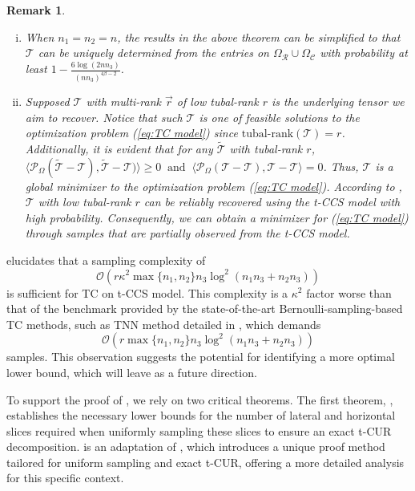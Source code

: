 \documentclass[twoside,12pt]{article}
\newtheorem{remark}{Remark}
\def\cO{\mathcal{O}}
\def\cO{\mathcal{O}}
\begin{document}
\begin{remark}
   \begin{enumerate}[(i)]
       \item 
 When $n_1=n_2=n$, the results in the above theorem can be simplified to that 
 $\mathcal{T}$ can be uniquely determined from the entries on $\Omega_{\mathcal{R}}\cup \Omega_{\mathcal{C}}$ with probability at least $1- \frac{6\log(2nn_3)}{(nn_3)^{4\beta-2}}$.
  \item 
Supposed $\mathcal{T}$ with multi-rank $\vec{r}$ of low tubal-rank $r$ is the underlying tensor we aim to recover. 
Notice that such \(\mathcal{T}\) is one of feasible solutions to the optimization problem (\ref{eq:TC model}) since $\text{tubal-rank}(\mathcal{T}) = r$. Additionally, it is evident that for any  $\widetilde{\mathcal{T}}$ with tubal-rank $r$, $\langle\mathcal{P}_{\Omega}(\widetilde{\mathcal{T}}-\mathcal{T}), \widetilde{\mathcal{T}}-\mathcal{T})\rangle \geq 0~ \text{ and }~ \langle\mathcal{P}_{\Omega}(\mathcal{T}-\mathcal{T}), \mathcal{T}-\mathcal{T}\rangle = 0$. Thus, 
\(\mathcal{T}\) is a  global minimizer to the optimization problem (\ref{eq:TC model}). According to , $\mathcal{T}$ with low tubal-rank $r$ can be reliably recovered using the t-CCS model with high probability. Consequently, we can obtain a minimizer for   (\ref{eq:TC model}) through samples that are partially observed from the t-CCS model.
 \end{enumerate}
\end{remark}
  elucidates that a sampling complexity of $$\cO(r\kappa^2\max\{n_1,n_2\}n_3\log^2(n_{1}n_{3}+n_{2}n_{3}))$$ is sufficient for TC on t-CCS model. This complexity is  a $\kappa^2$ factor worse than that of the benchmark provided by the state-of-the-art Bernoulli-sampling-based TC methods, such as TNN method detailed in \citep{zhang2017exact}, which demands 
\[
\mathcal{O}(r\max\{n_1,n_2\}n_3\log^2(n_{1}n_{3}+n_{2}n_{3}))
\]
samples.  This observation suggests the potential for identifying a more optimal lower bound, which will leave as  a future direction. 
 
To support the proof of , we rely on two critical theorems. The first theorem, , establishes the necessary lower bounds for the number of lateral and horizontal slices required when uniformly sampling these slices to ensure an exact t-CUR decomposition.  is an adaptation of \citep[Corollary 3.10]{Tarzanagh2018}, which introduces a unique proof method tailored for uniform sampling and exact t-CUR, offering a more detailed analysis for this specific context.
 
\end{document}
